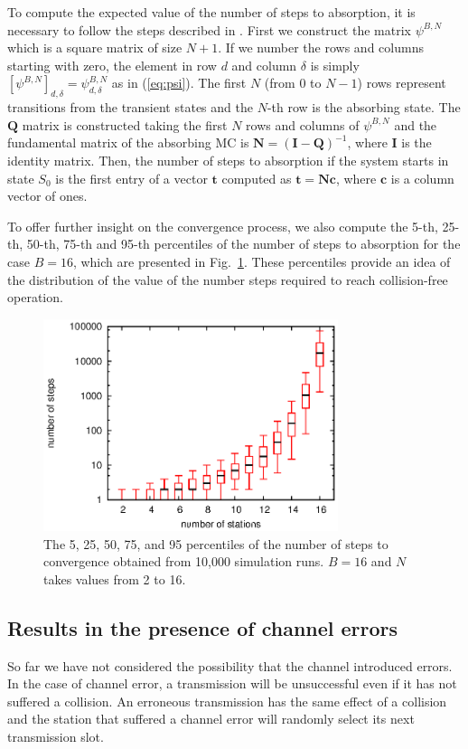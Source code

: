 \documentclass[journal]{IEEEtran}
\begin{document}
To compute the expected value of the number of steps to absorption, it is necessary to follow the steps described in \cite{grinstead1997ip}.
First we construct the matrix $\psi^{B,N}$ which is a square matrix of size $N+1$.
If we number the rows and columns starting with zero, the element in row $d$ and column $\delta$ is simply $\left[\psi^{B,N}\right]_{d,\delta} = \psi^{B,N}_{d,\delta}$ as in  (\ref{eq:psi}).
The first $N$ (from 0 to $N-1$) rows represent transitions from the transient states and the $N$-th row is the absorbing state.
The $\mathbf{Q}$ matrix is constructed taking the first $N$ rows and columns of $\psi^{B,N}$ and the fundamental matrix of the absorbing MC is $\mathbf{N}= (\mathbf{I}-\mathbf{Q})^{-1}$, where $\mathbf{I}$ is the identity matrix.
Then, the number of steps to absorption if the system starts in state $S_0$ is the first entry of a vector $\mathbf{t}$ computed as $\mathbf{t}=\mathbf{N}\mathbf{c}$, where $\mathbf{c}$ is a column vector of ones.

To offer further insight on the convergence process, we also compute the 5-th, 25-th, 50-th, 75-th and 95-th percentiles of the number of steps to absorption for the case $B=16$, which are presented in Fig.~\ref{fig:convergence_stats}.
These percentiles provide an idea of the distribution of the value of the number steps required to reach collision-free operation.
\begin{figure}[h]
\centering
\includegraphics[height=6.2cm]{figures/convergence_stats}
\caption{The 5, 25, 50, 75, and 95 percentiles of the number of steps to convergence obtained from 10,000 simulation runs. $B=16$ and $N$ takes values from 2 to 16.}
\label{fig:convergence_stats}
\end{figure}


\subsection{Results in the presence of channel errors}
So far we have not considered the possibility that the channel introduced errors. 
In the case of channel error, a transmission will be unsuccessful even if it has not suffered a collision.
An erroneous transmission has the same effect of a collision and the station that suffered a channel error will randomly select its next transmission slot.
\end{document}

